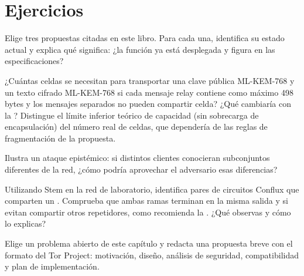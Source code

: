 \section*{Ejercicios}

\begin{esercizio}[1]\label{es:31-stato}
Elige tres propuestas citadas en este libro. Para cada una, identifica su estado actual y explica qué significa: ¿la función ya está desplegada y figura en las especificaciones?
\end{esercizio}

\begin{esercizio}[1]\label{es:31-celle}
¿Cuántas celdas se necesitan para transportar una clave pública ML-KEM-768 y un texto cifrado ML-KEM-768 si cada mensaje relay contiene como máximo 498 bytes y los mensajes separados no pueden compartir celda? ¿Qué cambiaría con la ? Distingue el límite inferior teórico de capacidad (sin sobrecarga de encapsulación) del número real de celdas, que dependería de las reglas de fragmentación de la propuesta.
\end{esercizio}

\begin{esercizio}[2]\label{es:31-epistemico}
Ilustra un ataque epistémico: si distintos clientes conocieran subconjuntos diferentes de la red, ¿cómo podría aprovechar el adversario esas diferencias?
\end{esercizio}

\begin{esercizio}[2]\label{es:31-conflux}
Utilizando Stem en la red de laboratorio, identifica pares de circuitos Conflux que comparten un . Comprueba que ambas ramas terminan en la misma salida y si evitan compartir otros repetidores, como recomienda la . ¿Qué observas y cómo lo explicas?
\end{esercizio}

\begin{esercizio}[3]\label{es:31-proposta}
Elige un problema abierto de este capítulo y redacta una propuesta breve con el formato del Tor Project: motivación, diseño, análisis de seguridad, compatibilidad y plan de implementación.
\end{esercizio}

